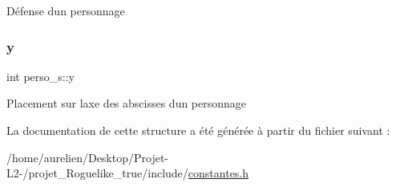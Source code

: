 Défense d\textquotesingle{}un personnage \mbox{\label{structperso__s_a74f226bdc5f8237c573fa5f54d10a44e}} 
\subsubsection{\texorpdfstring{y}{y}}
{\footnotesize\ttfamily int perso\+\_\+s\+::y}

Placement sur l\textquotesingle{}axe des abscisses d\textquotesingle{}un personnage 

La documentation de cette structure a été générée à partir du fichier suivant \+:\begin{DoxyCompactItemize}
\item 
/home/aurelien/\+Desktop/\+Projet-\/\+L2-\//projet\+\_\+\+Roguelike\+\_\+true/include/\hyperlink{constantes_8h}{constantes.\+h}\end{DoxyCompactItemize}
